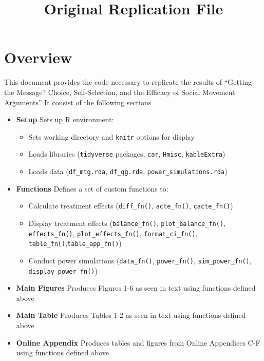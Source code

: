 \documentclass[
]{article}
\title{Original Replication File}
\author{}
\date{\vspace{-2.5em}}
\providecommand{\tightlist}{%
  \setlength{\itemsep}{0pt}\setlength{\parskip}{0pt}}
\begin{document}
\maketitle

\hypertarget{overview}{%
\section*{Overview}\label{overview}}

This document provides the code necessary to replicate the results of
``Getting the Message? Choice, Self-Selection, and the Efficacy of
Social Movement Arguments'' It consist of the following sections

\begin{itemize}
\tightlist
\item
  \textbf{Setup} Sets up R environment:

  \begin{itemize}
  \tightlist
  \item
    Sets working directory and \texttt{knitr} options for display
  \item
    Loads libraries (\texttt{tidyverse} packages, \texttt{car},
    \texttt{Hmisc}, \texttt{kableExtra})
  \item
    Loads data (\texttt{df\_mtg.rda}, \texttt{df\_qg.rda},
    \texttt{power\_simulations.rda})
  \end{itemize}
\item
  \textbf{Functions} Defines a set of custom functions to:

  \begin{itemize}
  \tightlist
  \item
    Calculate treatment effects (\texttt{diff\_fn()},
    \texttt{acte\_fn()}, \texttt{cacte\_fn()})
  \item
    Display treatment effects (\texttt{balance\_fn()},
    \texttt{plot\_balance\_fn()}, \texttt{effects\_fn()},
    \texttt{plot\_effects\_fn()}, \texttt{format\_ci\_fn()},
    \texttt{table\_fn()},\texttt{table\_app\_fn()})
  \item
    Conduct power simulations (\texttt{data\_fn()},
    \texttt{power\_fn()}, \texttt{sim\_power\_fn()},
    \texttt{display\_power\_fn()})
  \end{itemize}
\item
  \textbf{Main Figures} Produces Figures 1-6 as seen in text using
  functions defined above
\item
  \textbf{Main Table} Produces Tables 1-2 as seen in text using
  functions defined above
\item
  \textbf{Online Appendix} Produces tables and figures from Online
  Appendices C-F using functions defined above
\end{itemize}
\end{document}
